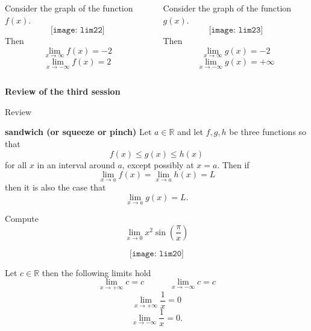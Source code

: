 \documentclass{beamer}
\begin{document}
\begin{frame}
\begin{columns}
	\begin{column}{.48\textwidth}
		\begin{Example}
			Consider the graph of the function $f(x)$. 
			$$
			\texttt{[image: lim22]}
			$$
			Then 
			$$\lim_{x\to \infty} f(x)=-2$$ $$ \lim_{x\to -\infty} f(x)=2$$ 
		\end{Example}
	\end{column}
	
	
	
	\begin{column}{.48\textwidth}
		\begin{Example}
			Consider the graph of the function $g(x)$. 
			$$
			\texttt{[image: lim23]}
			$$
			Then 
			$$\lim_{x\to \infty} g(x)=-2$$ $$ \lim_{x\to -\infty} g(x)=+\infty$$ 
		\end{Example}
	\end{column}
\end{columns}
\end{frame}

\begin{frame}
\begin{center}
	{\bf\color{blue} Review of the third session}
\end{center}
\end{frame}

\begin{frame}{Review}
\begin{theorem}{\bf sandwich (or squeeze or pinch) } 
	Let $a\in \mathbb{R}$ and let $f,g,h$ be three functions so that 
	$$f(x) \leq g(x) \leq h(x)$$
	for all $x$ in an interval around $a$, except possibly at $x=a$. Then if 
	$$\lim_{x\to a}f(x)=\lim_{x\to a}h(x)=L$$
	then it is also the case that 
	$$\lim_{x\to a}g(x)=L.$$
\end{theorem}

\end{frame}
\begin{frame}

\begin{Example}
	Compute 
	$$\lim_{x\to 0} x^2\sin(\frac{\pi}{x})$$
\end{Example}
$$
\texttt{[image: lim20]}
$$
\end{frame}



\begin{frame}
\begin{tcolorbox}[width=\textwidth,colback={blue!10},title={},colbacktitle=yellow,coltitle=blue] 
\begin{theorem}
	Let $c\in \mathbb{R}$ then the following limits hold
	$$\lim_{x\to +\infty} c=c\quad \quad \quad \lim_{x\to -\infty} c=c$$
	$$\lim_{x\to +\infty} \frac{1}{x}=0$$
	$$\lim_{x\to -\infty} \frac{1}{x}=0.$$
\end{theorem}
\end{tcolorbox}
\end{frame}
\end{document}
